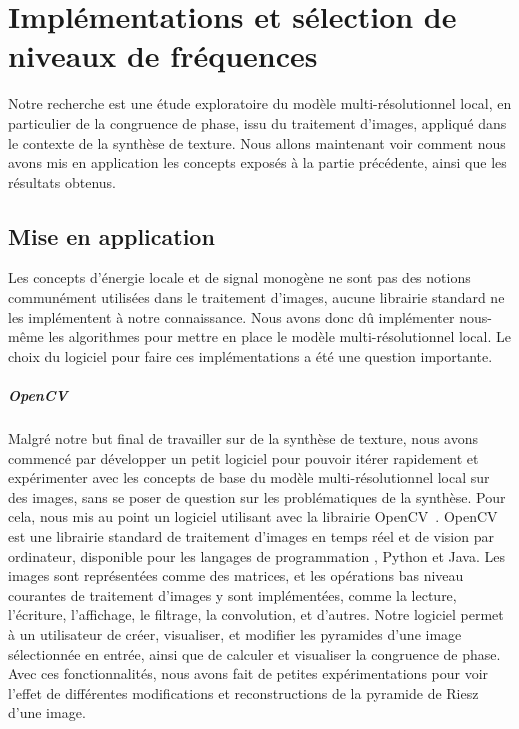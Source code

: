 \chapter{Implémentations et sélection de niveaux de fréquences}
\label{chap:chapitre2}

Notre recherche est une étude exploratoire du modèle multi-résolutionnel local, en particulier de la congruence de phase, issu du traitement d'images, appliqué dans le contexte de la synthèse de texture. Nous allons maintenant voir comment nous avons mis en application les concepts exposés à la partie précédente, ainsi que les résultats obtenus.

\section{Mise en application}

Les concepts d'énergie locale et de signal monogène ne sont pas des notions communément utilisées dans le traitement d'images, aucune librairie standard ne les implémentent à notre connaissance. Nous avons donc dû implémenter nous-même les algorithmes pour mettre en place le modèle multi-résolutionnel local. Le choix du logiciel pour faire ces implémentations a été une question importante.


\paragraph{OpenCV}

Malgré notre but final de travailler sur de la synthèse de texture, nous avons commencé par développer un petit logiciel pour pouvoir itérer rapidement et expérimenter avec les concepts de base du modèle multi-résolutionnel local sur des images, sans se poser de question sur les problématiques de la synthèse. Pour cela, nous mis au point un logiciel utilisant \cpp avec la librairie OpenCV~\cite{opencv_library}. OpenCV est une librairie standard de traitement d'images en temps réel et de vision par ordinateur, disponible pour les langages de programmation \cpp, Python et Java. Les images sont représentées comme des matrices, et les opérations bas niveau courantes de traitement d'images y sont implémentées, comme la lecture, l'écriture, l'affichage, le filtrage, la convolution, et d'autres.  Notre logiciel permet à un utilisateur de créer, visualiser, et modifier les pyramides d'une image sélectionnée en entrée, ainsi que de calculer et visualiser la congruence de phase. Avec ces fonctionnalités, nous avons fait de petites expérimentations pour voir l'effet de différentes modifications et reconstructions de la pyramide de Riesz d'une image.


